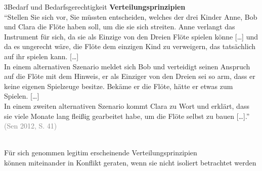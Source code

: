 \documentclass[xcolor=table,9pt,aspectratio=169]{beamer}
\begin{document}
\begin{frame}{\vspace*{10mm}3\hspace*{1em}Bedarf und Bedarfsgerechtigkeit}
\textbf{Verteilungsprinzipien}\\
\medskip
\enquote{Stellen Sie sich vor, Sie müssten entscheiden, welches der drei Kinder Anne, Bob und Clara die Flöte haben soll, um die sie sich streiten. Anne verlangt das Instrument für sich, da sie als Einzige von den Dreien Flöte spielen könne [\ldots] und da es ungerecht wäre, die Flöte dem einzigen Kind zu verweigern, das tatsächlich auf ihr spielen kann. [\ldots]\\
\medskip
In einem alternativen Szenario meldet sich Bob und verteidigt seinen Anspruch auf die Flöte mit dem Hinweis, er als Einziger von den Dreien sei so arm, dass er keine eigenen Spielzeuge besitze. Bekäme er die Flöte, hätte er etwas zum Spielen. [\ldots]\\
\medskip
In einem zweiten alternativen Szenario kommt Clara zu Wort und erklärt, dass sie viele Monate lang fleißig gearbeitet habe, um die Flöte selbst zu bauen [\ldots].} \textcolor{gray}{(Sen 2012, S. 41)}\\
\begin{center}
   \\
   {\color{blue2} \fontsize{10}{10}\selectfont%
   Für sich genommen legitim erscheinende Verteilungsprinzipien\\[0.2ex]
   können miteinander in Konflikt geraten, wenn sie nicht isoliert betrachtet werden}
\end{center}
\end{frame}
\end{document}
